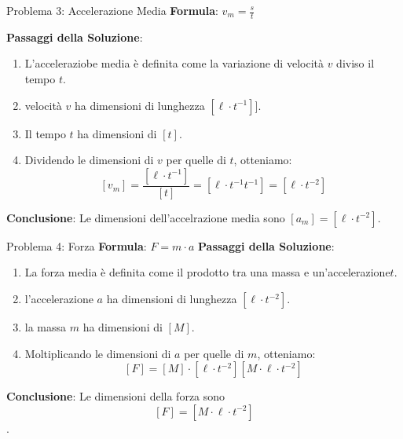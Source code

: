 \documentclass{beamer}
\begin{document}
\begin{frame}{Problema 3: Accelerazione Media}
    \textbf{Formula}: \( v_m = \frac{s}{t} \)
    
    \textbf{Passaggi della Soluzione}:
    \begin{enumerate}
        \item L'acceleraziobe media è definita come la variazione di velocità  \(v\) diviso il tempo \(t\).
        \item velocità  \(v\) ha dimensioni di lunghezza \([\ell \cdot t^{-1}]]\).
        \item Il tempo \(t\) ha dimensioni di \([t]\).
        \item Dividendo le dimensioni di \(v\) per quelle di \(t\), otteniamo:
        \[
        [v_m] = \frac{[\ell \cdot t^{-1}]}{[t]} = [\ell \cdot t^{-1} t^{-1}] = [\ell \cdot t^{-2}]
        \]
    \end{enumerate}
    \textbf{Conclusione}: Le dimensioni dell'accelrazione media sono \([a_m] = [\ell \cdot t^{-2}]\).
\end{frame}

\begin{frame}{Problema 4: Forza}
    \textbf{Formula}: $ F = m \cdot a $
    \textbf{Passaggi della Soluzione}:
    \begin{enumerate}
        \item La forza media è definita come il prodotto tra una massa e un'accelerazione\(t\).
        \item l'accelerazione  \(a\) ha dimensioni di lunghezza \([\ell \cdot t^{-2}]\).
        \item la massa \(m\) ha dimensioni di \([M]\).
        \item Moltiplicando le dimensioni di $a$ per quelle di \(m \), otteniamo:
        \[
        [F] = [M] \cdot [\ell \cdot t^{-2}]  [M \cdot \ell \cdot t^{-2}]
        \]
    \end{enumerate}
    \textbf{Conclusione}: Le dimensioni della forza sono \[[F] = [M \cdot \ell \cdot t^{-2}]\].
\end{frame}
\end{document}
